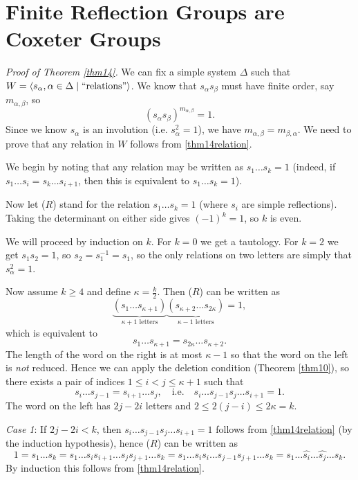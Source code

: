 \section{Finite Reflection Groups are Coxeter Groups}

{\em Proof of Theorem \ref{thm14}.}
We can fix a simple system $\Delta$ such that
$W = \langle s_\alpha, \alpha \in \Delta \mid \text{``relations''} \rangle$. We know
that $s_\alpha s_\beta$ must have finite order, say $m_{\alpha,\beta}$, so
\begin{equation} \label{thm14relation}
(s_\alpha s_\beta)^{m_{\alpha, \beta}} = 1. \tag{\textasteriskcentered}
\end{equation}
Since we know $s_\alpha$ is an
involution (i.e. $s_\alpha^2 = 1$), we have $m_{\alpha, \beta} = m_{\beta, \alpha}$.
We need to prove that any relation in $W$ follows from \eqref{thm14relation}.

We begin by noting that any relation may be written as $s_1 \dots s_k = 1$
(indeed, if $s_1 \dots s_i = s_k \dots s_{i+1}$, then this is equivalent to
$s_1 \dots s_k = 1$).

Now let ($R$) stand for the relation $s_1 \dots s_k = 1$ (where $s_i$ are simple
reflections). Taking the determinant on either side gives $(-1)^k = 1$, so $k$
is even.

We will proceed by induction on $k$. For $k = 0$ we get a tautology.
For $k = 2$ we get $s_1 s_2 = 1$, so $s_2 = s_1^{-1} = s_1$, so the only
relations on two letters are simply that $s_\alpha^2 = 1$.

Now assume $k \geq 4$ and define $\kappa = \frac{k}{2}$. Then ($R$) can be
written as
\[
    \underbrace{(s_1 \dots s_{\kappa+1})}_{\kappa+1 \text{ letters}}
    \underbrace{(s_{\kappa+2} \dots s_{2 \kappa})}_{\kappa-1 \text{ letters}} = 1,
\]
which is equivalent to
\[
    s_1 \dots s_{\kappa+1} = s_{2 \kappa} \dots s_{\kappa + 2}.
\]
The length of the word on the right is at most $\kappa-1$ so that the word on
the left is {\em not} reduced. Hence we can apply the deletion condition (Theorem
\ref{thm10}), so there exists a pair of indices $1 \leq i < j \leq \kappa+1$
such that
\[
    s_i \dots s_{j-1} = s_{i+1} \dots s_j,
\quad
\text{i.e.}
\quad
    s_i \dots s_{j-1} s_j \dots s_{i+1} = 1.
\]
The word on the left has $2j-2i$ letters and $2 \leq 2(j-i) \leq 2\kappa = k$.

{\em Case 1}: If $2j-2i < k$, then $s_i \dots s_{j-1} s_j \dots s_{i+1} = 1$
follows from \eqref{thm14relation} (by the induction hypothesis), hence ($R$)
can be written as
\[
    1 = s_1 \dots s_k = s_1 \dots s_i s_{i+1} \dots s_j s_{j+1} \dots s_k
    = s_1 \dots s_i s_i \dots s_{j-1} s_{j+1} \dots s_k
    = s_1 \dots \hat{s_i} \dots \hat{s_j} \dots s_k.
\]
By induction this follows from \eqref{thm14relation}.

